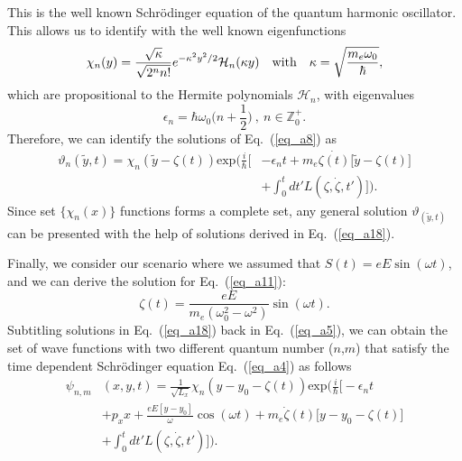 This is the well known Schrödinger equation of the quantum harmonic oscillator.
This allows us to identify with the well known eigenfunctions \cite{griffiths18,shankar94}
\begin{equation} \label{eq_a16}
  \chi_n(y) =
   \frac{\sqrt{\kappa}}{\sqrt{2^{n}n!}}
  e^{-\kappa^2 y^2/2}
  \mathcal{H}_n \qty(\kappa y) \quad \text{with}
  \quad
  \kappa = \sqrt{\frac{m_e \omega_0}{\hbar}},
\end{equation}
which are propositional to the Hermite polynomials $\mathcal{H}_n$, with eigenvalues
\begin{equation} \label{eq_a17}
  \epsilon_n = \hbar \omega_0 \bigg(n + \frac{1}{2}\bigg)
  ~,~
  n \in \mathbb{Z}^{+}_0.
\end{equation}
Therefore, we can identify the solutions of Eq.~(\ref{eq_a8}) as
\begin{equation} \label{eq_a18}
  \begin{aligned}
    \vartheta_n(\tilde{y},t) = \chi_n(\tilde{y} - \zeta(t))
     \text{exp}\bigg(\frac{i}{\hbar}\bigg[&- \epsilon_nt +
    m_e\dot{\zeta(t)}\big[\tilde{y}-\zeta(t)\big] \\
     & + \int_0^{t}dt'L(\zeta,\dot{\zeta},t')\bigg]\bigg).
  \end{aligned}
\end{equation}
Since set $\{\chi_n(x)\}$ functions forms a complete set, any general solution $\vartheta_(\tilde{y},t)$ can be presented with the help of solutions derived in Eq.~(\ref{eq_a18}).

Finally, we consider our scenario where we assumed that $S(t) = eE\sin(\omega t)$, and we can derive the solution for Eq.~(\ref{eq_a11}):
\begin{equation} \label{eq_a19}
  \zeta(t) = \frac{eE}{m_e(\omega_0^2 - \omega^2)}\sin(\omega t).
\end{equation}
Subtitling solutions in Eq.~(\ref{eq_a18}) back in Eq.~(\ref{eq_a5}), we can obtain the set of wave functions with two different quantum number ($n$,$m$) that satisfy the time dependent Schrödinger equation Eq.~(\ref{eq_a4}) as follows
\begin{equation} \label{eq_a20}
  \begin{aligned}
    \psi_{n,m}&(x,y,t)  = \frac{1}{\sqrt{L_x}}
    \chi_n\left(y - y_0 - \zeta(t)\right)
    \text{exp}\bigg(
    \frac{i}{\hbar}\bigg[- \epsilon_nt \\
    &
    + p_x x + \frac{eE[y - y_0]}{\omega}\cos(\omega t)+
    m_e\dot{\zeta}(t)\big[y - y_0 -\zeta(t)\big]\\
    & +
    \int_0^{t}dt'L(\zeta,\dot{\zeta},t')\bigg]\bigg).
  \end{aligned}
\end{equation}
